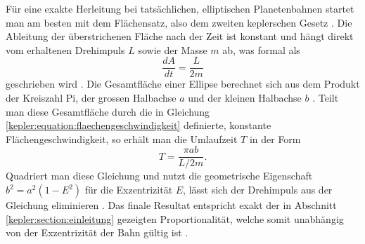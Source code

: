 Für eine exakte Herleitung bei tatsächlichen, elliptischen Planetenbahnen startet man am besten mit dem Flächensatz, also dem zweiten keplerschen Gesetz \cite{astro2012}.
Die Ableitung der überstrichenen Fläche nach der Zeit ist konstant und hängt direkt vom erhaltenen Drehimpuls \(L\) sowie der Masse \(m\) ab, was formal als
\begin{equation}
    \frac{dA}{dt} = \frac{L}{2m}
    \label{kepler:equation:flaechengeschwindigkeit}
\end{equation}
geschrieben wird \cite{astro2012}.
Die Gesamtfläche einer Ellipse berechnet sich aus dem Produkt der Kreiszahl Pi, der grossen Halbachse \(a\) und der kleinen Halbachse \(b\) \cite{astro2012}.
Teilt man diese Gesamtfläche durch die in Gleichung \eqref{kepler:equation:flaechengeschwindigkeit} definierte, konstante Flächengeschwindigkeit, so erhält man die Umlaufzeit \(T\) in der Form
\begin{equation}
    T = \frac{\pi a b}{L / 2m} .
    \label{kepler:equation:umlaufzeit_flaeche}
\end{equation}
Quadriert man diese Gleichung und nutzt die geometrische Eigenschaft \(b^2 = a^2(1-E^2)\) für die Exzentrizität \(E\), lässt sich der Drehimpuls aus der Gleichung eliminieren \cite{astro2012}.
Das finale Resultat entspricht exakt der in Abschnitt \ref{kepler:section:einleitung} gezeigten Proportionalität, welche somit unabhängig von der Exzentrizität der Bahn gültig ist \cite{astro2012}.

